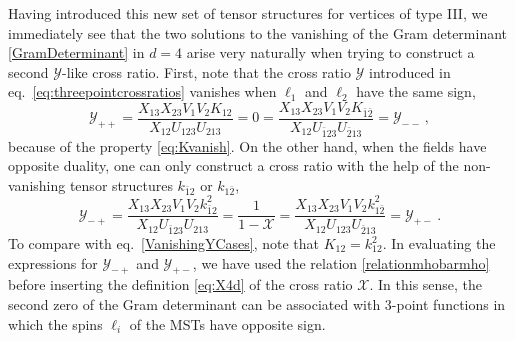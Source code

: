 \documentclass{article}
\def\mK{k}
\begin{document}
Having introduced this new set of tensor structures for vertices of type III, we immediately see that the two solutions to the vanishing of the Gram determinant 
\eqref{GramDeterminant} in $d=4$ arise very naturally when trying to construct a 
second $\mathcal{Y}$-like cross ratio. First, note that the cross ratio 
$\mathcal{Y}$ introduced in eq.\ \eqref{eq:threepointcrossratios} vanishes
when $\ell_1$ and $\ell_2$ have the same sign,  
\begin{equation}
 \mathcal{Y}_{++} = \frac{X_{13} X_{23} 
    V_1 V_2 K_{12}}{X_{12}U_{123}U_{213}} = 0 = 
     \frac{X_{13} X_{23} 
    V_1 V_2 K_{\bar{1}\bar{2}}}{X_{12}U_{\bar{1}23}U_{\bar{2}13}}
    = \mathcal{Y}_{--}\,,  
    \label{VanishingYCases}
\end{equation} 
because of the property \eqref{eq:Kvanish}. On the other hand, when the fields 
have opposite duality, one can only construct a cross ratio with the help of the 
non-vanishing tensor structures $\mK_{\bar{1}2}$ or $\mK_{1\bar{2}}$,  
\begin{equation}
\mathcal{Y}_{-+} = \frac{X_{13} X_{23} 
    V_1 V_2 \mK^2_{\bar{1}2}}{X_{12}U_{\bar{1}23}U_{213}} = 
    \frac{1}{1-\mathcal{X}} 
    =  \frac{X_{13} X_{23} 
    V_1 V_2 \mK^2_{1\bar{2}}}{X_{12}U_{123}U_{\bar{2}13}}
    = \mathcal{Y}_{+-}\ .  
\end{equation} 
To compare with eq.\ \eqref{VanishingYCases}, note that $K_{12} = k_{12}^2$.
In evaluating the expressions for $\mathcal{Y}_{-+}$ and $\mathcal{Y}_{+-}$, 
we have used the relation \eqref{relationmhobarmho} before inserting the 
definition \eqref{eq:X4d} of the cross ratio $\mathcal{X}$. In this sense, 
the second zero of the Gram determinant can be associated with 3-point 
functions in which the spins $\ell_i$ of the MSTs have opposite sign. 
 
\end{document}
